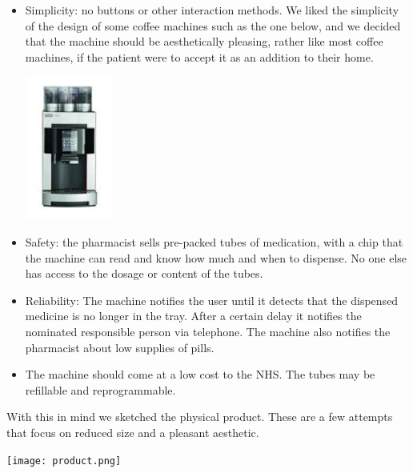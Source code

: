 \documentclass{article}
\begin{document}
	\begin{itemize}
	\item Simplicity: no buttons or other interaction methods. We liked the simplicity of the design of some coffee machines such as the one below, and we decided that the machine should be aesthetically pleasing, rather like most coffee machines, if the patient were to accept it as an addition to their home.
	\begin{center}\includegraphics{coffee.png}\end{center}
	\item Safety: the pharmacist sells pre-packed tubes of medication, with a chip that the machine can read and know how much and when to dispense. No one else has access to the dosage or content of the tubes.
	\item Reliability: The machine notifies the user until it detects that the dispensed medicine is no longer in the tray. After a certain delay it notifies the nominated responsible person via telephone. The machine also notifies the pharmacist about low supplies of pills.
	\item The machine should come at a low cost to the NHS. The tubes may be refillable and reprogrammable.
	\end{itemize}
	With this in mind we sketched the physical product. These are a few attempts that focus on reduced size and a pleasant aesthetic.
	\begin{center}\texttt{[image: product.png]}\end{center}
\end{document}
